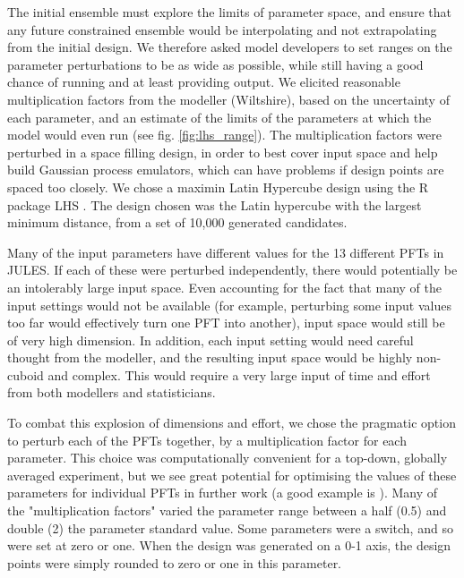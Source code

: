 \documentclass[gmd, manuscript]{copernicus}
\begin{document}
The initial ensemble must explore the limits of parameter space, and ensure that any future constrained ensemble would be interpolating and not extrapolating from the initial design. We therefore asked model developers to set ranges on the parameter perturbations to be as wide as possible, while still having a good chance of running and at least providing output. We elicited reasonable multiplication factors from the modeller (Wiltshire), based on the uncertainty of each parameter, and an estimate of the limits of the parameters at which the model would even run (see fig. \ref{fig:lhs_range}). The multiplication factors were perturbed in a space filling design, in order to best cover input space and help build Gaussian process emulators, which can have problems if design points are spaced too closely. We chose a maximin Latin Hypercube design using the R package LHS \citep{Rpackage2021lhs}. The design chosen was the Latin hypercube with the largest minimum distance, from a set of 10,000 generated candidates.

Many of the input parameters have different values for the 13 different PFTs in JULES. If each of these were perturbed independently, there would potentially be an intolerably large input space. Even accounting for the fact that many of the input settings would not be available (for example, perturbing some input values too far would effectively turn one PFT into another), input space would still be of very high dimension. In addition, each input setting would need careful thought from the modeller, and the resulting input space would be highly non-cuboid and complex. This would require a very large input of time and effort from both modellers and statisticians.

To combat this explosion of dimensions and effort, we chose the pragmatic option to perturb each of the PFTs together, by a multiplication factor for each parameter. This choice was computationally convenient for a top-down, globally averaged experiment, but we see great potential for optimising the values of these parameters for individual PFTs in further work (a good example is \cite{gmd-15-1913-2022}). Many of the "multiplication factors" varied the parameter range between a half (0.5) and double (2) the parameter standard value. Some parameters were a switch, and so were set at zero or one. When the design was generated on a 0-1 axis, the design points were simply rounded to zero or one in this parameter.
\end{document}
